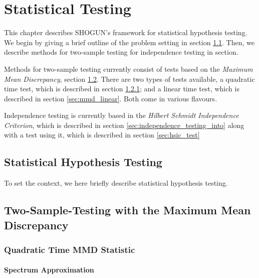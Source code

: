 %

\chapter{Statistical Testing}
This chapter describes SHOGUN's framework for statistical hypothesis testing. We begin by giving a brief outline of the problem setting in section \ref{sec:hypothesis_testing_into}. Then, we describe methods for two-sample testing for independence testing in section.

Methods for two-sample testing currently consist of tests based on the \emph{Maximum Mean Discrepancy}, section \ref{sec:mmd_into}. There are two types of tests available, a quadratic time test, which is described in section \ref{sec:mmd_quadratic}; and a linear time test, which is described in section \ref{sec:mmd_linear}. Both come in various flavours.

Independence testing is currently based in the \emph{Hilbert Schmidt Independence Criterion}, which is described in section \ref{sec:independence_testing_into} along with a test using it, which is described in section \ref{sec:hsic_test}

\section{Statistical Hypothesis Testing}
\label{sec:hypothesis_testing_into}

To set the context, we here briefly describe statistical hypothesis testing.

\section{Two-Sample-Testing with the Maximum Mean Discrepancy}
\label{sec:mmd_into}

\subsection{Quadratic Time MMD Statistic}
\label{sec:mmd_quadratic}

\subsubsection{Spectrum Approximation}
